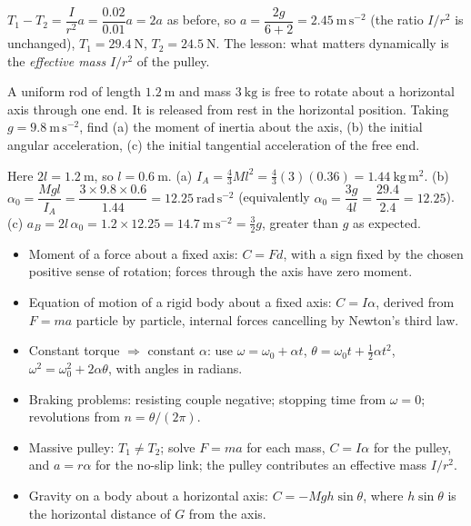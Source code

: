 \documentclass[11pt]{article}
\begin{document}
\begin{corrige}[Exercise 2]
$T_1 - T_2 = \dfrac{I}{r^{2}}a = \dfrac{0.02}{0.01}a = 2a$ as before, so $a = \dfrac{2g}{6 + 2} = 2.45\ \mathrm{m\,s^{-2}}$ (the ratio $I/r^{2}$ is unchanged), $T_1 = 29.4\ \mathrm{N}$, $T_2 = 24.5\ \mathrm{N}$. The lesson: what matters dynamically is the \emph{effective mass} $I/r^{2}$ of the pulley.
\end{corrige}

\begin{exercice}
A uniform rod of length $1.2\ \mathrm{m}$ and mass $3\ \mathrm{kg}$ is free to rotate about a horizontal axis through one end. It is released from rest in the horizontal position. Taking $g = 9.8\ \mathrm{m\,s^{-2}}$, find (a) the moment of inertia about the axis, (b) the initial angular acceleration, (c) the initial tangential acceleration of the free end.
\end{exercice}

\begin{corrige}[Exercise 3]
Here $2l = 1.2\ \mathrm{m}$, so $l = 0.6\ \mathrm{m}$.
(a) $I_A = \tfrac{4}{3}Ml^{2} = \tfrac{4}{3}(3)(0.36) = 1.44\ \mathrm{kg\,m^{2}}$.
(b) $\alpha_0 = \dfrac{Mgl}{I_A} = \dfrac{3 \times 9.8 \times 0.6}{1.44} = 12.25\ \mathrm{rad\,s^{-2}}$ (equivalently $\alpha_0 = \dfrac{3g}{4l} = \dfrac{29.4}{2.4} = 12.25$).
(c) $a_B = 2l\,\alpha_0 = 1.2 \times 12.25 = 14.7\ \mathrm{m\,s^{-2}} = \tfrac{3}{2}g$, greater than $g$ as expected.
\end{corrige}

\begin{aretenir}
\begin{itemize}
\item Moment of a force about a fixed axis: $C = Fd$, with a sign fixed by the chosen positive sense of rotation; forces through the axis have zero moment.
\item Equation of motion of a rigid body about a fixed axis: $C = I\alpha$, derived from $F = ma$ particle by particle, internal forces cancelling by Newton's third law.
\item Constant torque $\Rightarrow$ constant $\alpha$: use $\omega = \omega_0 + \alpha t$, $\theta = \omega_0 t + \tfrac12 \alpha t^{2}$, $\omega^{2} = \omega_0^{2} + 2\alpha\theta$, with angles in radians.
\item Braking problems: resisting couple negative; stopping time from $\omega = 0$; revolutions from $n = \theta/(2\pi)$.
\item Massive pulley: $T_1 \neq T_2$; solve $F = ma$ for each mass, $C = I\alpha$ for the pulley, and $a = r\alpha$ for the no-slip link; the pulley contributes an effective mass $I/r^{2}$.
\item Gravity on a body about a horizontal axis: $C = -Mgh\sin\theta$, where $h\sin\theta$ is the horizontal distance of $G$ from the axis.
\end{itemize}
\end{aretenir}
\end{document}
